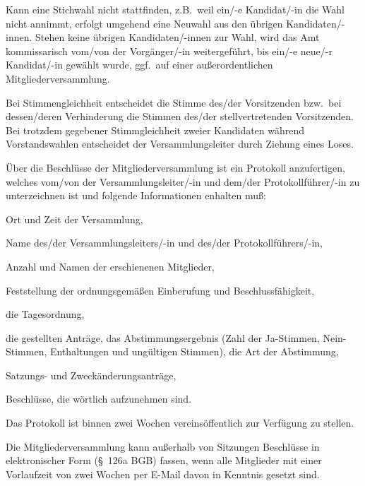 \documentclass[draft]{scrartcl}
\begin{document}
\begin{contract}
Kann eine Stichwahl nicht stattfinden, z.B.\ weil ein/-e Kandidat/-in die Wahl
nicht annimmt, erfolgt umgehend eine Neuwahl aus den übri\-gen
Kandidaten/-innen. Stehen keine übri\-gen Kandidaten/-innen zur Wahl, wird das
Amt kommissarisch vom/von der Vorgänger/-in weitergeführt, bis ein/-e neue/-r
Kandidat/-in gewählt wurde, ggf.\ auf einer außerordentlichen
Mitgliederversammlung.

Bei Stimmengleichheit entscheidet die Stimme des/der Vorsitzenden bzw.\ bei
dessen/deren Verhinderung die Stimmen des/der stellvertretenden Vorsitzenden. Bei
trotzdem gegebener Stimmgleichheit zweier Kandidaten während Vorstandswahlen
entscheidet der Versammlungsleiter durch Ziehung eines Loses.


Über die Beschlüsse der Mitgliederversammlung ist ein Protokoll anzufertigen,
welches vom/von der Versammlungsleiter/-in und dem/der Protokollführer/-in zu
unterzeichnen ist und folgende Informationen enhalten muß:
\begin{compactenum}[\hspace{2em}1.]
  \item Ort und Zeit der Versammlung,
  \item Name des/der Versammlungsleiters/-in und des/der Protokollführers/-in,
  \item Anzahl und Namen der erschienenen Mitglieder,
  \item Feststellung der ordnungsgemäßen Einberufung und Beschlussfähigkeit,
  \item die Tagesordnung,
  \item die gestellten Anträge, das Abstimmungsergebnis (Zahl der Ja-Stimmen,
    Nein-Stimmen, Enthaltungen und ungültigen Stimmen), die Art der
    Abstimmung,
  \item Satzungs- und Zweckänderungsanträge,
  \item Beschlüsse, die wörtlich aufzunehmen sind.
\end{compactenum}

Das Protokoll ist binnen zwei Wochen vereinsöffentlich zur Verfügung zu
stellen.

\label{AusserordentlicheBeschluesse}

Die Mitgliederversammlung kann außerhalb von Sitzungen Beschlüsse in
elektronischer Form (§~126a BGB) fassen, wenn alle Mitglieder mit einer
Vorlaufzeit von zwei Wochen per E-Mail davon in Kenntnis gesetzt
sind.\label{eBeschluss}


\end{contract}
\end{document}
